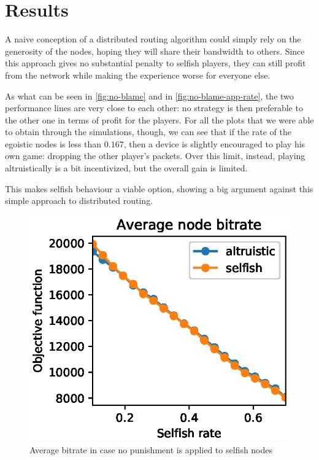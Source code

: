 \documentclass[conference]{IEEEtran}
\begin{document}
\section{Results} \label{sec:results}


A naive conception of a distributed routing algorithm could simply rely on the generosity of the nodes, hoping they will share their bandwidth to others.
Since this approach gives no substantial penalty to selfish players, they can still profit from the network while making the experience worse for everyone else.

As what can be seen in \autoref{fig:no-blame} and in \autoref{fig:no-blame-app-rate}, the two performance lines are very close to each other: no strategy is then  preferable to the other one in terms of profit for the players. For all the plots that we were able to obtain through the simulations, though, we can see that if the rate of the egoistic nodes is less than $0.167$, then a device is slightly encouraged to play his own game: dropping the other player's packets.
Over this limit, instead, playing altruistically is a bit incentivized, but the overall gain is limited.

This makes selfish behaviour a viable option, showing a big argument against this simple approach to distributed routing.

\begin{figure}[h]
  \includegraphics{figures/obj_func_vs_selfish_rate_no_punish.eps}
  \caption{Average bitrate in case no punishment is applied to selfish nodes}
  \label{fig:no-blame}
\end{figure}
\end{document}
